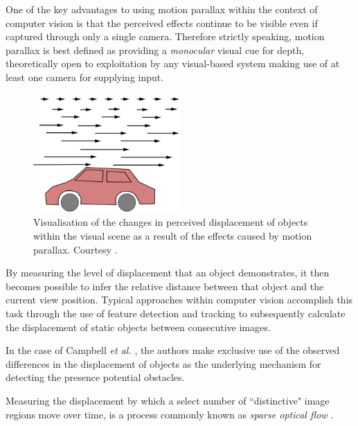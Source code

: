 One of the key advantages to using motion parallax within the context of computer vision is that the perceived effects continue to be visible even if captured through only a single camera. Therefore strictly speaking, motion parallax is best defined as providing a \textit{monocular} visual cue for depth, theoretically open to exploitation by any visual-based system making use of at least one camera for supplying input.

\begin{figure}
\vspace{-20pt}
  \begin{center}
    \includegraphics[width=0.5\textwidth]{images/motion_parallax.png}
  \end{center}
  \vspace{-10pt}
  \caption{Visualisation of the changes in perceived displacement of objects within the visual scene as a result of the effects caused by motion parallax. Courtesy \cite{akshay}.}
     \label{fig:parallax}
  \vspace{-20pt}
\end{figure}
 
 By measuring the level of displacement that an object demonstrates, it then becomes possible to infer the relative distance between that object and the current view position. Typical approaches within computer vision accomplish this task through the use of feature detection and tracking to subsequently calculate the displacement of static objects between consecutive images. 

In the case of Campbell \textit{et al.} \cite{campbell}, the authors make exclusive use of the observed differences in the displacement of objects as the underlying mechanism for  detecting the presence potential obstacles. 

Measuring the displacement by which a select number of ``distinctive" image regions move over time, is a process commonly known as \textit{sparse optical flow} \cite{nourani}.

